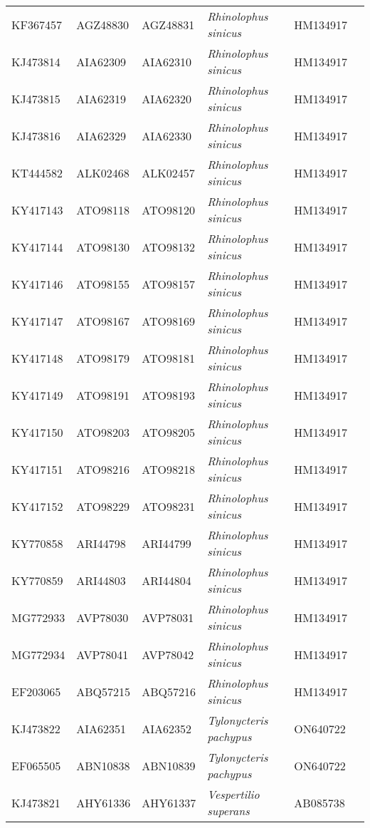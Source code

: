 \documentclass[9pt]{article}
\begin{document}
\begin{landscape}
\begin{longtable}{p{2cm} p{3cm} p{2.7cm} p{5.7cm} p{2cm} p{2cm}}
KF367457&AGZ48830&AGZ48831&\textit{Rhinolophus sinicus}&HM134917& \cite{ge2013isolation, lau2005severe}\\
KJ473814&AIA62309&AIA62310&\textit{Rhinolophus sinicus}&HM134917& \cite{wu2016orf8, lau2005severe}\\
KJ473815&AIA62319&AIA62320&\textit{Rhinolophus sinicus}&HM134917& \cite{wu2016orf8, lau2005severe}\\
KJ473816&AIA62329&AIA62330&\textit{Rhinolophus sinicus}&HM134917& \cite{wu2016orf8, lau2005severe}\\
KT444582&ALK02468&ALK02457&\textit{Rhinolophus sinicus}&HM134917& \cite{yang2016isolation, lau2005severe}\\
KY417143&ATO98118&ATO98120&\textit{Rhinolophus sinicus}&HM134917& \cite{hu2017discovery, lau2005severe}\\
KY417144&ATO98130&ATO98132&\textit{Rhinolophus sinicus}&HM134917& \cite{hu2017discovery, lau2005severe}\\
KY417146&ATO98155&ATO98157&\textit{Rhinolophus sinicus}&HM134917& \cite{hu2017discovery, lau2005severe}\\
KY417147&ATO98167&ATO98169&\textit{Rhinolophus sinicus}&HM134917& \cite{hu2017discovery, lau2005severe}\\
KY417148&ATO98179&ATO98181&\textit{Rhinolophus sinicus}&HM134917& \cite{hu2017discovery, lau2005severe}\\
KY417149&ATO98191&ATO98193&\textit{Rhinolophus sinicus}&HM134917& \cite{hu2017discovery, lau2005severe}\\
KY417150&ATO98203&ATO98205&\textit{Rhinolophus sinicus}&HM134917& \cite{hu2017discovery, lau2005severe}\\
KY417151&ATO98216&ATO98218&\textit{Rhinolophus sinicus}&HM134917& \cite{hu2017discovery, lau2005severe}\\
KY417152&ATO98229&ATO98231&\textit{Rhinolophus sinicus}&HM134917& \cite{hu2017discovery, lau2005severe}\\
KY770858&ARI44798&ARI44799&\textit{Rhinolophus sinicus}&HM134917& \cite{lau2005severe}\\
KY770859&ARI44803&ARI44804&\textit{Rhinolophus sinicus}&HM134917& \cite{lau2005severe}\\
MG772933&AVP78030&AVP78031&\textit{Rhinolophus sinicus}&HM134917& \cite{lau2005severe}\\
MG772934&AVP78041&AVP78042&\textit{Rhinolophus sinicus}&HM134917& \cite{lau2005severe}\\
EF203065 &ABQ57215&ABQ57216&\textit{Rhinolophus sinicus} &HM134917& \cite{lau2005severe}\\
KJ473822&AIA62351&AIA62352&\textit{Tylonycteris pachypus}&ON640722& \cite{wu2016deciphering}\\
EF065505&ABN10838&ABN10839&\textit{Tylonycteris pachypus} &ON640722& \cite{woo2007comparative}\\
KJ473821&AHY61336&AHY61337&\textit{Vespertilio superans}&AB085738& \cite{wu2016orf8, sakai2003molecular}\\
\hline
\end{longtable}
\end{landscape}
\end{document}
